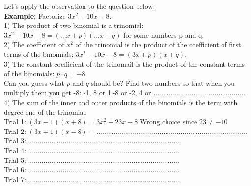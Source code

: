 \documentclass{ximera}
\begin{document}
Let's apply the observation to the question below:\\

{\bf Example:} Factorize $3x^2 - 10x -8 $.\\

1) The product of two binomial is a trinomial: $3x^2 - 10x -8  = (...x + p) (...x + q)$ for some numbers p and q. \\

2)  The coefficient of $x^2$ of the trinomial is the product of the coefficient of first terms of the binomials: $3x^2 - 10x -8  = (3x + p) (x + q)$.\\

3) The constant coefficient of the trinomail is the product of the constant terms of the binomials: $ p \cdot q = -8 $.\\

Can you guess what $p$ and $q$ should be? Find two numbers so that when you multiply them you get -8: -1, 8 or 1,-8 or -2, 4 or ................................................\\

4) The sum of the inner and outer products of the binomials is the term with degree one of the trinomial: \\

Trial 1: $(3x -1)(x+8) = 3x^2 + 23x - 8$  \hspace{2cm} Wrong choice since $23 \neq -10$\\

Trial 2: $(3x +1)(x-8) = $...............................................................................\\

Trial 3: ...............................................................................\\

Trial 4: ...............................................................................\\

Trial 5: ...............................................................................\\

Trial 6: ...............................................................................\\

Trial 7: ...............................................................................\\
\end{document}
